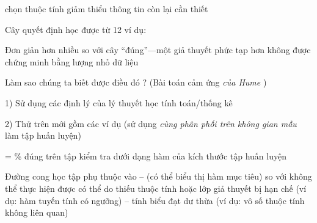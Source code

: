 \documentclass{article}
\begin{document}
\begin{huge}
\mat{$\implies$} chọn thuộc tính giảm thiểu thông tin còn lại cần thiết



Cây quyết định học được từ 12 ví dụ:

\vspace*{0.2in}

\textwidth
{}

Đơn giản hơn nhiều so với cây “đúng”---một giả thuyết phức tạp hơn
không được chứng minh bằng lượng nhỏ dữ liệu




Làm sao chúng ta biết được điều đó ? (Bài toán cảm ứng \emph{ của Hume })

1) Sử dụng các định lý của lý thuyết học tính toán/thống kê

2) Thử  trên  mới gồm các ví dụ \al
  (sử dụng \emph{cùng phân phối trên không gian mẫu} làm tập huấn luyện)

 = \% đúng trên tập kiểm tra dưới dạng hàm của kích thước tập huấn luyện

\vspace*{-0.2in}

\textwidth
{}








Đường cong học tập phụ thuộc vào \al
 --  (có thể biểu thị hàm mục tiêu) so với \nl
     không thể thực hiện được có thể do thiếu thuộc tính \nl
     hoặc lớp giả thuyết bị hạn chế (ví dụ: hàm tuyến tính có ngưỡng)\al
 -- tính biểu đạt dư thừa (ví dụ: vô số thuộc tính không liên quan)

\vspace*{0.2in}

\textwidth
{}




\end{huge}
\end{document}
